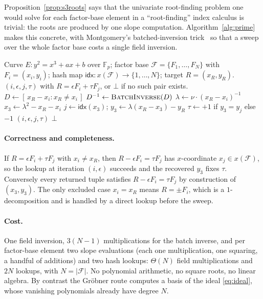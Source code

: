 \documentclass[10pt,a4paper]{article}
\theoremstyle{remark}
\newcommand{\FF}{\mathbb{F}}
\newcommand{\Fb}{\mathcal{F}}
\newcommand{\abs}[1]{\lvert #1 \rvert}
\begin{document}
Proposition~\ref{prop:s3roots} says that the univariate root-finding
problem one would solve for each factor-base element in a
``root-finding'' index calculus is trivial: the roots are produced by
one slope computation. Algorithm~\ref{alg:prime} makes this concrete,
with Montgomery's batched-inversion trick~\cite{montgomery1987} so that
a sweep over the whole factor base costs a single field inversion.

\begin{algorithm}[t]
\caption{Prime-curve $2$-decomposition by direct subtraction}
\label{alg:prime}
\begin{algorithmic}[1]
\Require Curve $E: y^2 = x^3 + ax + b$ over $\FF_p$; factor base
  $\Fb = \{F_1,\ldots,F_N\}$ with $F_i = (x_i, y_i)$; hash map
  $\mathsf{idx}: x(\Fb) \to \{1,\ldots,N\}$; target $R = (x_R, y_R)$.
\Ensure $(i, \epsilon, j, \tau)$ with $R = \epsilon F_i + \tau F_j$, or
  $\bot$ if no such pair exists.
\State $D \gets [\,x_R - x_i : x_R \neq x_i\,]$ 
\State $D^{-1} \gets \textsc{BatchInverse}(D)$ 
    \State $\lambda \gets \nu \cdot (x_R - x_i)^{-1}$ 
    \State $x_3 \gets \lambda^2 - x_R - x_i$ 
      \State $j \gets \mathsf{idx}(x_3)$;\;
             $y_3 \gets \lambda (x_R - x_3) - y_R$
      \State $\tau \gets +1$ if $y_3 = y_j$ else $-1$
      \State \Return $(i, \epsilon, j, \tau)$
    \EndIf
  \EndFor
\EndFor
\State \Return $\bot$
\end{algorithmic}
\end{algorithm}

\paragraph{Correctness and completeness.} If $R = \epsilon F_i + \tau
F_j$ with $x_i \neq x_R$, then $R - \epsilon F_i = \tau F_j$ has
$x$-coordinate $x_j \in x(\Fb)$, so the lookup at iteration $(i,\epsilon)$
succeeds and the recovered $y_3$ fixes $\tau$. Conversely every returned
tuple satisfies $R - \epsilon F_i = \tau F_j$ by construction of
$(x_3, y_3)$. The only excluded case $x_i = x_R$ means $R = \pm F_i$,
which is a $1$-decomposition and is handled by a direct lookup before
the sweep.

\paragraph{Cost.} One field inversion, $3(N-1)$ multiplications for the
batch inverse, and per factor-base element two slope evaluations
(each one multiplication, one squaring, a handful of additions) and two
hash lookups: $\Theta(N)$ field multiplications and $2N$ lookups, with
$N = \abs{\Fb}$. No polynomial arithmetic, no square roots, no linear
algebra. By contrast the Gr\"obner route computes a basis of the ideal
\eqref{eq:ideal}, whose vanishing polynomials already have degree $N$.
\end{document}
